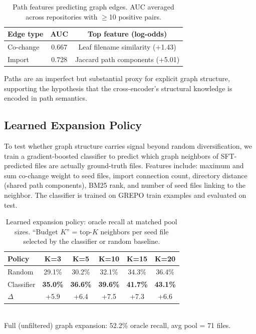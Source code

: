 \documentclass{article}
\begin{document}
\begin{table}[h]
\centering
\caption{Path features predicting graph edges. AUC averaged across repositories with $\geq$10 positive pairs.}
\label{tab:path_pred}
\small
\begin{tabular}{lcc}
\toprule
\textbf{Edge type} & \textbf{AUC} & \textbf{Top feature (log-odds)} \\
\midrule
Co-change & 0.667 & Leaf filename similarity ($+$1.43) \\
Import & 0.728 & Jaccard path components ($+$5.01) \\
\bottomrule
\end{tabular}
\end{table}

Paths are an imperfect but substantial proxy for explicit graph structure, supporting the hypothesis that the cross-encoder's structural knowledge is encoded in path semantics.


\subsection{Learned Expansion Policy}
\label{app:learned_expansion}

To test whether graph structure carries signal beyond random diversification, we train a gradient-boosted classifier to predict which graph neighbors of SFT-predicted files are actually ground-truth files.
Features include: maximum and sum co-change weight to seed files, import connection count, directory distance (shared path components), BM25 rank, and number of seed files linking to the neighbor.
The classifier is trained on GREPO train examples and evaluated on test.

\begin{table}[h]
\centering
\caption{Learned expansion policy: oracle recall at matched pool sizes. ``Budget $K$'' = top-$K$ neighbors per seed file selected by the classifier or random baseline.}
\label{tab:learned_expansion}
\small
\begin{tabular}{lccccc}
\toprule
\textbf{Policy} & \textbf{K=3} & \textbf{K=5} & \textbf{K=10} & \textbf{K=15} & \textbf{K=20} \\
\midrule
Random & 29.1\% & 30.2\% & 32.1\% & 34.3\% & 36.4\% \\
Classifier & \textbf{35.0\%} & \textbf{36.6\%} & \textbf{39.6\%} & \textbf{41.7\%} & \textbf{43.1\%} \\
\midrule
$\Delta$ & +5.9 & +6.4 & +7.5 & +7.3 & +6.6 \\
\bottomrule
\end{tabular}
\\[4pt]
{\footnotesize Full (unfiltered) graph expansion: 52.2\% oracle recall, avg pool = 71 files.}
\end{table}
\end{document}
